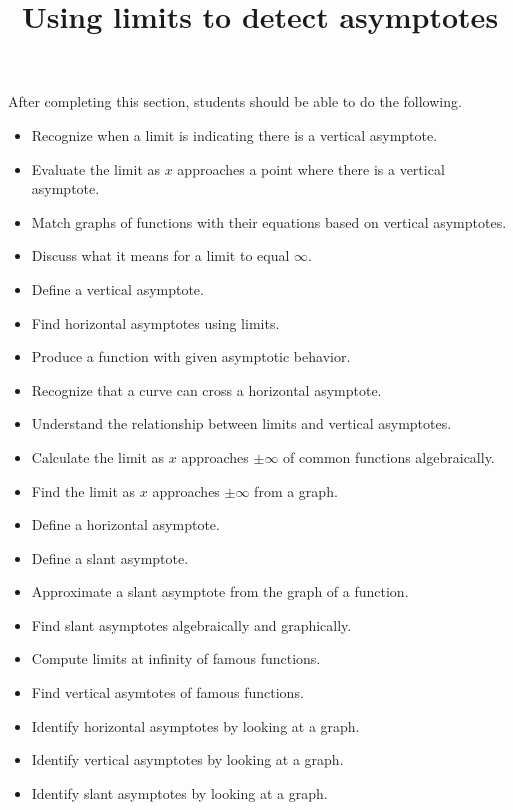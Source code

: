 \documentclass{ximera}
\title{Using limits to detect asymptotes}
\begin{document}
\begin{abstract}
\end{abstract}

\maketitle

\begin{sectionOutcomes}

After completing this section, students should be able to do the following.

\begin{itemize}
\item Recognize when a limit is indicating there is a vertical asymptote.
\item Evaluate the limit as $x$ approaches a point where there is a vertical asymptote.
\item Match graphs of functions with their equations based on vertical asymptotes.
\item Discuss what it means for a limit to equal $\infty$.
\item Define a vertical asymptote.
\item Find horizontal asymptotes using limits.
\item Produce a function with given asymptotic behavior.
\item Recognize that a curve can cross a horizontal asymptote.
\item Understand the relationship between limits and vertical asymptotes.
\item Calculate the limit as $x$ approaches $\pm \infty$ of common functions algebraically.
\item Find the limit as $x$ approaches $\pm \infty$ from a graph.
\item Define a horizontal asymptote.
\item Define a slant asymptote.
\item Approximate a slant asymptote from the graph of a
  function.
\item Find slant asymptotes algebraically and graphically.
\item Compute limits at infinity of famous functions.
\item Find vertical asymtotes of famous functions.
\item Identify horizontal asymptotes by looking at a graph.
\item Identify vertical asymptotes by looking at a graph.
\item Identify slant asymptotes by looking at a graph.
\end{itemize}
\end{sectionOutcomes}
\end{document}
